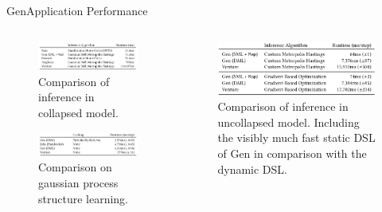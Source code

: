 \documentclass[AERbeamer%
              ,optEnglish%
              ,optBiber%
              ,optBibstyleAlphabetic%
              ,optBeamerClassicFormat%
              ]{AERlatex}%
\begin{document}
\begin{frame}[c]{Gen}{Application Performance}
    \centering
    \begin{columns}[T]
        \begin{column}{0.48\textwidth}
            \centering
            \begin{figure}
                \centering
                \includegraphics[width=\textwidth]{GenInferenceinCollapsedModel.png}
                \caption{Comparison of inference in collapsed model.}
            \end{figure}
            \begin{figure}
                \centering
                \includegraphics[width=\textwidth]{GenGPStructureLearning.png}
                \caption{Comparison on gaussian process structure learning.}
            \end{figure}
        \end{column}
        \begin{column}{0.48\textwidth}
            \centering
            \begin{figure}
                \centering
                \includegraphics[width=\textwidth]{GenInferenceUncollapsedModel.png}
                \caption{Comparison of inference in uncollapsed model. Including the visibly
                         much fast static DSL of Gen in comparison with the dynamic DSL.}
            \end{figure}
        \end{column}
    \end{columns}
\end{frame}
\end{document}
